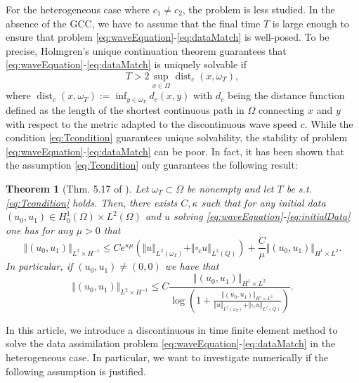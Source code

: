 \documentclass[sn-mathphys-num]{sn-jnl}
\newtheorem{thm}{Theorem}[section]
\numberwithin{equation}{section}
\newcommand{\wop}{\square_c}
\begin{document}
\noindent For the heterogeneous case where $c_1 \not =  c_2$, the problem is less studied. In the absence of the GCC, we have to assume that the final time $T$ is large enough to ensure that problem \eqref{eq:waveEquation}-\eqref{eq:dataMatch} is well-posed. To be precise, Holmgren's unique continuation theorem guarantees that \eqref{eq:waveEquation}-\eqref{eq:dataMatch} is uniquely solvable if
\begin{equation}\label{eq:Tcondition}
    T > 2 \sup_{x \in \Omega} \operatorname{dist}_{c}(x,\omega_T),
\end{equation}
where $\operatorname{dist}_c(x,\omega_T) := \inf_{y \in \omega_T} d_c(x,y)$ with $d_c$ being the distance function defined as the length of the shortest continuous path in $\Omega$ connecting $x$ and $y$ with respect to the metric adapted to the discontinuous wave speed $c$. While the condition \eqref{eq:Tcondition} guarantees unique solvability, the stability of problem \eqref{eq:waveEquation}-\eqref{eq:dataMatch} can be poor. In fact, it has been shown \cite[Thm. 5.17]{Filippas22} that the assumption \eqref{eq:Tcondition} only guarantees the following result:  
\begin{thm}[Thm. 5.17 of \cite{Filippas22}]\label{thm:filippas}
    Let $\omega_T \subset \Omega$ be nonempty and let $T$ be s.t. \eqref{eq:Tcondition} holds. Then, there exists $C,\kappa$ such that for any initial data $(u_0,u_1) \in H^1_0(\Omega) \times L^2(\Omega)$ and $u$ solving \eqref{eq:waveEquation}-\eqref{eq:initialData} one has for any $\mu > 0$ that 
    \begin{equation}\label{eq:FilippasEstimate}
        \Vert (u_0,u_1) \Vert_{L^2 \times H^{-1}} \le C e^{\kappa \mu} \left( \Vert u \Vert_{L^2(\omega_T)} + \Vert \wop u \Vert_{L^2(Q)} \right) + \frac{C}{\mu} \Vert (u_0,u_1) \Vert_{H^1 \times L^2}. 
    \end{equation}
    In particular, if $(u_0,u_1) \not = (0,0)$ we have that 
    \begin{equation}\label{eq:FilippasEstimateLog}
        \Vert (u_0,u_1) \Vert_{L^2 \times H^{-1}} \le C \frac{\Vert (u_0,u_1) \Vert_{H^1 \times L^2}}{\log \left( 1 + \frac{\Vert (u_0,u_1) \Vert_{H^1 \times L^2}}{ \Vert u \Vert_{L^2(\omega_T)} + \Vert \wop u \Vert_{L^2(Q)}} \right)}. 
    \end{equation} 
\end{thm} 



\noindent In this article, we introduce a discontinuous in time finite element method to solve the data assimilation problem \eqref{eq:waveEquation}-\eqref{eq:dataMatch} in the heterogeneous case. In particular, we want to investigate numerically if the following assumption is justified. 
\end{document}
